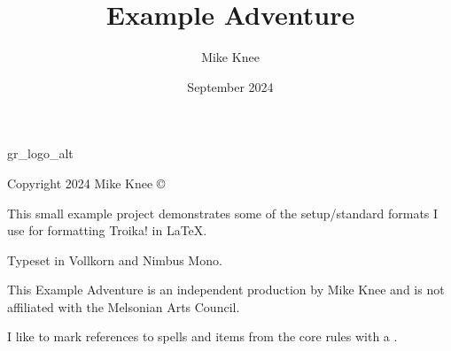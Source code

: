 \documentclass[a5paper, openany, twoside, 10pt]{memoir}
\title{Example Adventure}
\author{Mike Knee}
\date{September 2024}
\begin{document}

    
    
    



\begin{copyrightpage}{gr_logo_alt}

Copyright 2024 Mike Knee \copyright

This small example project demonstrates some of the setup/standard formats I use for formatting Troika! in \LaTeX.

Typeset in Vollkorn and Nimbus Mono.

This Example Adventure is an independent production by Mike Knee and is not affiliated with the Melsonian Arts Council.

I like to mark references to spells and items from the core  rules with a \corereference.

\end{copyrightpage}

\tableofcontents

\vfill
\pagebreak
\sloppy
\end{document}
